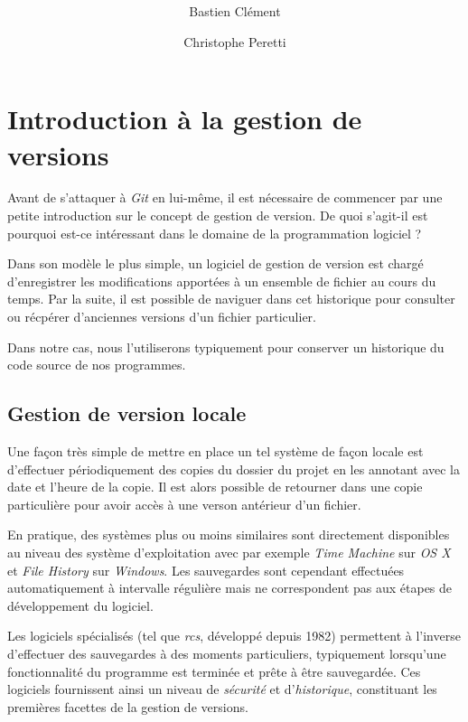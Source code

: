 \documentclass[11pt,a4paper]{article}
\author{Bastien Clément \and Christophe Peretti}
\title{{\normalsize \doccourse} \\ \doctitle }
\begin{document}
\maketitle
\vspace{3em}

\tableofcontents

\section{Introduction à la gestion de versions}

Avant de s'attaquer à \textit{Git} en lui-même, il est nécessaire de commencer par une petite introduction sur le concept de gestion de version. De quoi s'agit-il est pourquoi est-ce intéressant dans le domaine de la programmation logiciel ?

Dans son modèle le plus simple, un logiciel de gestion de version est chargé d'enregistrer les modifications apportées à un ensemble de fichier au cours du temps. Par la suite, il est possible de naviguer dans cet historique pour consulter ou récpérer d'anciennes versions d'un fichier particulier.

Dans notre cas, nous l'utiliserons typiquement pour conserver un historique du code source de nos programmes.

\subsection{Gestion de version locale}

Une façon très simple de mettre en place un tel système de façon locale est d'effectuer périodiquement des copies du dossier du projet en les annotant avec la date et l'heure de la copie. Il est alors possible de retourner dans une copie particulière pour avoir accès à une verson antérieur d'un fichier.

En pratique, des systèmes plus ou moins similaires sont directement disponibles au niveau des système d'exploitation avec par exemple \textit{Time Machine} sur \textit{OS X} et \textit{File History} sur \textit{Windows}. Les sauvegardes sont cependant effectuées automatiquement à intervalle régulière mais ne correspondent pas aux étapes de développement du logiciel.

Les logiciels spécialisés (tel que \textit{rcs}, développé depuis 1982) permettent à l'inverse d'effectuer des sauvegardes à des moments particuliers, typiquement lorsqu'une fonctionnalité du programme est terminée et prête à être sauvegardée. Ces logiciels fournissent ainsi un niveau de \textit{sécurité} et d'\textit{historique}, constituant les premières facettes de la gestion de versions.
\end{document}

